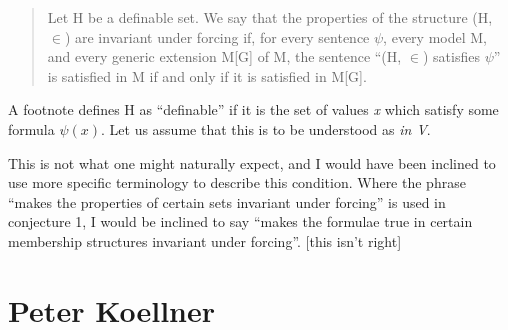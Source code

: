 \begin{quote}
Let H be a definable set.
We say that the properties of the structure (H, $\in$) are invariant under forcing if, for every sentence $\psi$, every model M, and every generic extension M[G] of M, the sentence ``(H, $\in$) satisfies $\psi$'' is satisfied in M if and only if it is satisfied in M[G].
\end{quote}

A footnote defines H as ``definable'' if it is the set of values \emph{x} which satisfy some formula $\psi(x)$. 
Let us assume that this is to be understood as \emph{in V}.

This is not what one might naturally expect, and I would have been inclined to use more specific terminology to describe this condition.
Where the phrase ``makes the properties of certain sets invariant under forcing'' is used in conjecture 1, I would be inclined to say ``makes the formulae true in certain membership structures invariant under forcing''. 
[this isn't right]

\section{Peter Koellner}

